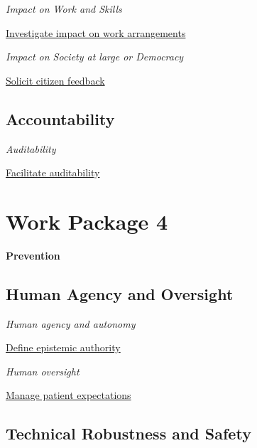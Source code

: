 \documentclass[
  letterpaper,
  DIV=11,
  numbers=noendperiod]{scrreport}
\begin{document}
\emph{Impact on Work and Skills}

\protect\hyperlink{investigate-impact-on-work-arrangements}{Investigate
impact on work arrangements}

\emph{Impact on Society at large or Democracy}

\protect\hyperlink{solicit-citizen-feedback}{Solicit citizen feedback}

\hypertarget{accountability-2}{%
\section*{Accountability}\label{accountability-2}}


\emph{Auditability}

\protect\hyperlink{facilitate-auditability}{Facilitate auditability}


\hypertarget{work-package-4}{%
\chapter*{Work Package 4}\label{work-package-4}}


\textbf{Prevention}

\hypertarget{human-agency-and-oversight-3}{%
\section*{Human Agency and
Oversight}\label{human-agency-and-oversight-3}}


\emph{Human agency and autonomy}

\protect\hyperlink{define-epistemic-authority}{Define epistemic
authority}

\emph{Human oversight}

\protect\hyperlink{manage-patient-expectations}{Manage patient
expectations}

\hypertarget{technical-robustness-and-safety-3}{%
\section*{Technical Robustness and
Safety}\label{technical-robustness-and-safety-3}}
\end{document}
